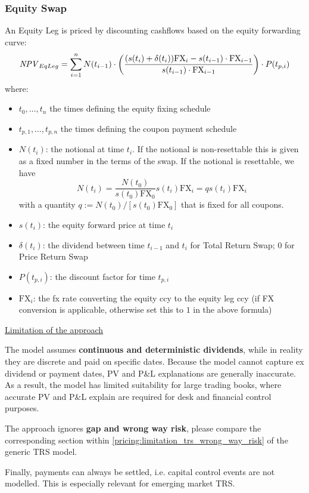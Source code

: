 \subsubsection{Equity Swap}
\label{pricing::eq_swap}

An Equity Leg is priced by discounting cashflows based on the 
equity forwarding curve:
$$
\mathit{NPV}_{EqLeg} = \sum_{i=1}^n N(t_{i-1})\cdot \left(\frac{(s(t_i) + \delta(t_i)) \text{FX}_i - s(t_{i-1})\cdot \text{FX}_{i-1}
  }{s(t_{i-1}) \cdot \text{FX}_{i-1}}\right) \cdot P(t_{p,i})
$$
where:
\begin{itemize}
\item $t_0, \ldots, t_n$ the times defining the equity fixing schedule
\item $t_{p,1}, \ldots, t_{p,n}$ the times defining the coupon payment schedule
\item $N(t_i)$: the notional at time $t_i$. If the notional is non-resettable this is given as a fixed number in the
  terms of the swap. If the notional is resettable, we have
  $$N(t_i) = \frac{N(t_0)}{s(t_0) \text{FX}_0} s(t_i) \text{FX}_i = q s(t_i) \text{FX}_i$$
  with a quantity $q := N(t_0) / [ s(t_0) \text{FX}_0 ]$ that is fixed for all coupons.
\item $s(t_i)$: the equity forward price at time $t_i$
\item $\delta(t_i)$: the dividend between time $t_{i-1}$ and $t_i$ for Total Return Swap; $0$ for Price Return Swap 
\item $P(t_{p,i})$: the discount factor for time $t_{p,i}$
\item $\text{FX}_i$: the fx rate converting the equity ccy to the equity leg ccy (if FX conversion is applicable, otherwise set
  this to $1$ in the above formula)
\end{itemize}

\smallskip

\underline{Limitation of the approach}

The model assumes \textbf{continuous and deterministic dividends}, while in reality they are discrete and paid on specific dates.
Because the model cannot capture ex dividend or payment dates, PV and P\&L explanations are generally inaccurate.
As a result, the model has limited suitability for large trading books,
where accurate PV and P\&L explain are required for desk and financial control purposes.

\smallskip

The approach ignores \textbf{gap and wrong way risk}, please compare the corresponding section within \ref{pricing:limitation_trs_wrong_way_risk} of the generic TRS model.

Finally, payments can always be settled, i.e. capital control events are not modelled. This is especially relevant for emerging market TRS.